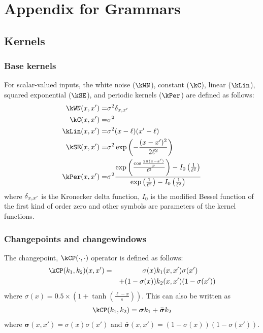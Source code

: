 
\inbpdocument

\chapter{Appendix for Grammars}


\section{Kernels}

\subsection{Base kernels}

For scalar-valued inputs, the white noise ($\kWN$), constant ($\kC$), linear ($\kLin$), squared exponential ($\kSE$), and periodic kernels ($\kPer$) are defined as follows:
\begin{eqnarray}
\kWN(\inputVar, \inputVar') =& \sigma^2\delta_{\inputVar, \inputVar'} \\
\kC(\inputVar, \inputVar') =& \sigma^2 \\
\kLin(\inputVar, \inputVar') =& \sigma^2(\inputVar - \ell)(\inputVar' - \ell) \\
\kSE(\inputVar, \inputVar') =& \sigma^2\exp\left(-\frac{(\inputVar - \inputVar')^2}{2\ell^2}\right) \\
\kPer(\inputVar, \inputVar') =&  \sigma^2\frac{\exp\left(\frac{\cos\frac{2 \pi (\inputVar - \inputVar')}{p}}{\ell^2}\right) - I_0\left(\frac{1}{\ell^2}\right)}{\exp\left(\frac{1}{\ell^2}\right) - I_0\left(\frac{1}{\ell^2}\right)}
\end{eqnarray}
where $\delta_{x, x'}$ is the Kronecker delta function, $I_0$ is the modified Bessel function of the first kind of order zero and other symbols are parameters of the kernel functions.

\subsection{Changepoints and changewindows}

The changepoint, $\kCP(\cdot,\cdot)$ operator is defined as follows:
\begin{align}
\kCP(\kernel_1, \kernel_2)(x, x') = \qquad \qquad \sigma(x) & k_1(x,x')\sigma(x') \nonumber \\ + (1-\sigma(x)) & k_2(x,x')(1-\sigma(x'))
\end{align}
where $\sigma(x) = 0.5 \times (1 + \tanh(\frac{\ell - x}{s}))$.
This can also be written as
\begin{align}
\kCP(\kernel_1, \kernel_2) = \boldsymbol\sigma\kernel_1 + \boldsymbol{\bar\sigma}\kernel_2
\end{align}
where $\boldsymbol\sigma(x,x') = \sigma(x)\sigma(x')$ and $\boldsymbol{\bar\sigma}(x,x') = (1-\sigma(x))(1-\sigma(x'))$.

